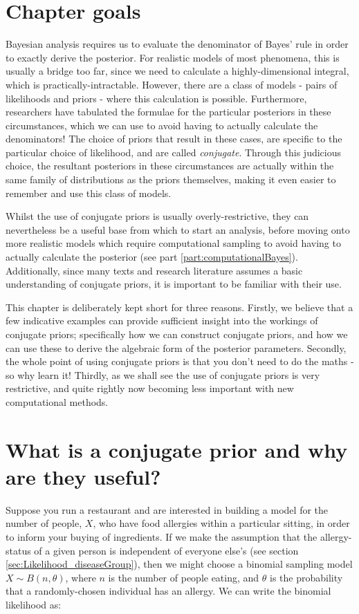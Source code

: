 \documentclass[11pt,fullpage]{book}
\begin{document}
\section{Chapter goals}
Bayesian analysis requires us to evaluate the denominator of Bayes' rule in order to exactly derive the posterior. For realistic models of most phenomena, this is usually a bridge too far, since we need to calculate a highly-dimensional integral, which is practically-intractable. However, there are a class of models - pairs of likelihoods and priors - where this calculation is possible. Furthermore, researchers have tabulated the formulae for the particular posteriors in these circumstances, which we can use to avoid having to actually calculate the denominators! The choice of priors that result in these cases, are specific to the particular choice of likelihood, and are called \textit{conjugate}. Through this judicious choice, the resultant posteriors in these circumstances are actually within the same family of distributions as the priors themselves, making it even easier to remember and use this class of models. 

Whilst the use of conjugate priors is usually overly-restrictive, they can nevertheless be a useful base from which to start an analysis, before moving onto more realistic models which require computational sampling to avoid having to actually calculate the posterior (see part \ref{part:computationalBayes}). Additionally, since many texts and research literature assumes a basic understanding of conjugate priors, it is important to be familiar with their use.  

This chapter is deliberately kept short for three reasons. Firstly, we believe that a few indicative examples can provide sufficient insight into the workings of conjugate priors; specifically how we can construct conjugate priors, and how we can use these to derive the algebraic form of the posterior parameters. Secondly, the whole point of using conjugate priors is that you don't need to do the maths - so why learn it! Thirdly, as we shall see the use of conjugate priors is very restrictive, and quite rightly now becoming less important with new computational methods.

\section{What is a conjugate prior and why are they useful?}
Suppose you run a restaurant and are interested in building a model for the number of people, $X$, who have food allergies within a particular sitting, in order to inform your buying of ingredients. If we make the assumption that the allergy-status of a given person is independent of everyone else's (see section \ref{sec:Likelihood_diseaseGroup}), then we might choose a binomial sampling model $X\sim B(n,\theta)$, where $n$ is the number of people eating, and $\theta$ is the probability that a randomly-chosen individual has an allergy. We can write the binomial likelihood as:
\end{document}
